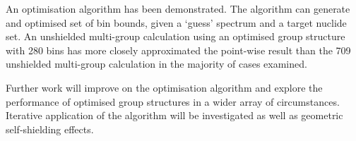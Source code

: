 An optimisation algorithm has been demonstrated. The algorithm can generate and optimised set of bin bounds, given a `guess' spectrum and a target nuclide set. An unshielded multi-group calculation using an optimised group structure with 280 bins has more closely approximated the point-wise result than the 709 unshielded multi-group calculation in the majority of cases examined.

Further work will improve on the optimisation algorithm and explore the performance of optimised group structures in a wider array of circumstances. Iterative application of the algorithm will be investigated as well as geometric self-shielding effects. 

